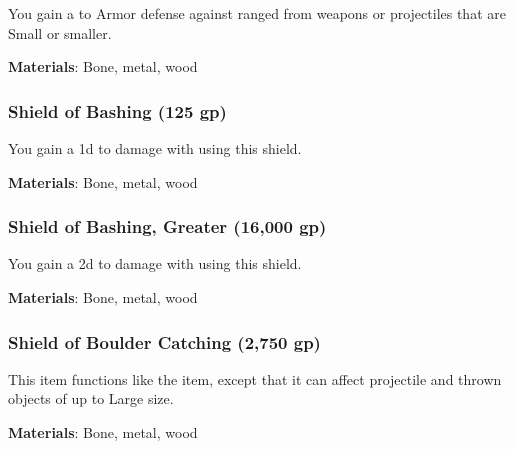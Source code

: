 You gain a   to Armor defense against ranged  from weapons or projectiles that are Small or smaller.



\vspace{0.25em}
\textbf{Materials}: Bone, metal, wood


\lowercase{\hypertarget{item:Shield of Bashing}{}}\label{item:Shield of Bashing}
\hypertarget{item:Shield of Bashing}{\subsubsection{Shield of Bashing\hfill{} (125 gp)}}

You gain a \plus1d  to damage with  using this shield.



\vspace{0.25em}
\textbf{Materials}: Bone, metal, wood


\lowercase{\hypertarget{item:Shield of Bashing, Greater}{}}\label{item:Shield of Bashing, Greater}
\hypertarget{item:Shield of Bashing, Greater}{\subsubsection{Shield of Bashing, Greater\hfill{} (16,000 gp)}}

You gain a \plus2d  to damage with  using this shield.



\vspace{0.25em}
\textbf{Materials}: Bone, metal, wood


\lowercase{\hypertarget{item:Shield of Boulder Catching}{}}\label{item:Shield of Boulder Catching}
\hypertarget{item:Shield of Boulder Catching}{\subsubsection{Shield of Boulder Catching\hfill{} (2,750 gp)}}

This item functions like the  item, except that it can affect projectile and thrown objects of up to Large size.



\vspace{0.25em}
\textbf{Materials}: Bone, metal, wood


